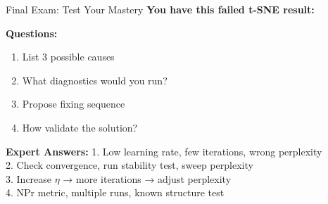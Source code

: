 \documentclass[aspectratio=169]{beamer}
\begin{document}
\begin{frame}{Final Exam: Test Your Mastery}
\textbf{You have this failed t-SNE result:}
\begin{center}
\end{center}

\textbf{Questions:}
\begin{enumerate}
\item List 3 possible causes
\item What diagnostics would you run?
\item Propose fixing sequence
\item How validate the solution?
\end{enumerate}

\pause
\textbf{Expert Answers:}
\small
1. Low learning rate, few iterations, wrong perplexity\\
2. Check convergence, run stability test, sweep perplexity\\
3. Increase $\eta$ → more iterations → adjust perplexity\\
4. NPr metric, multiple runs, known structure test
\end{frame}
\end{document}
